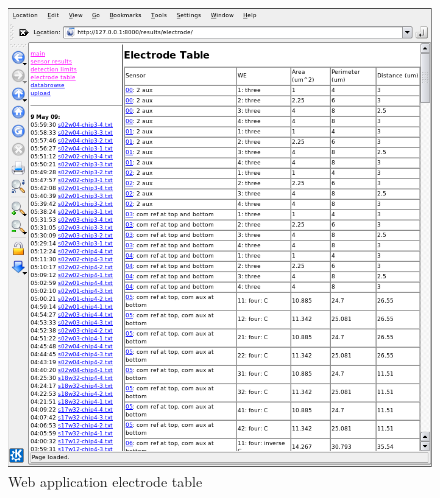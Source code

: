 \begin{figure}
	\centering
	\includegraphics[width=\linewidth]{figures/web-electrodes.png}
	\caption{Web application electrode table}
\end{figure}
